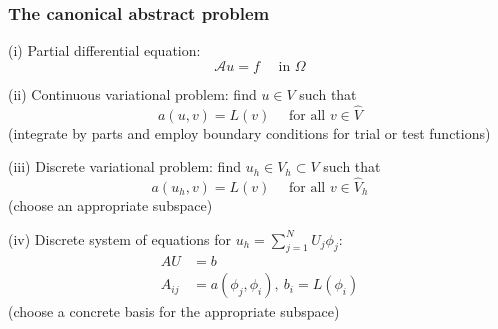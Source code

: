 \begin{frame}
  \frametitle{The canonical abstract problem}

  (i) Partial differential equation:
  \begin{equation*}
    \mathcal{A} u = f \quad \text{ in } \Omega
  \end{equation*}

  (ii) Continuous variational problem: find $u \in V$ such that
  \begin{equation*}
    a(u, v) = L(v) \quad \text{ for all } v \in \hat{V}
  \end{equation*}
  (integrate by parts and employ boundary conditions for trial or test functions)

  (iii) Discrete variational problem: find $u_h \in V_h \subset
  V$ such that
  \begin{equation*}
    a(u_h, v) = L(v) \quad \text{ for all } v \in \hat{V}_h
  \end{equation*}
  (choose an appropriate subspace)

  (iv) Discrete system of equations for $u_h = \sum_{j=1}^N
  U_j \phi_j$:
  \begin{align*}
    A U &= b \\
    A_{ij} &= a(\phi_j, \phi_i), \  
    b_i   = L(\phi_i)
  \end{align*}
  (choose a concrete basis for the appropriate subspace)

\end{frame}
